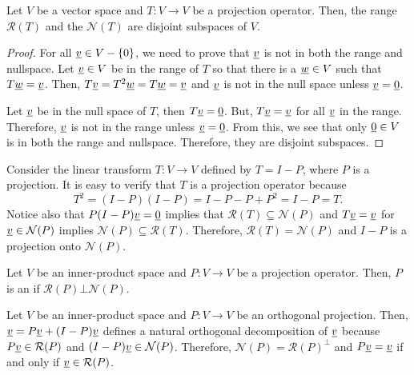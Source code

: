 \begin{theorem}
Let $V$ be a vector space and $T: V \rightarrow V$ be a projection operator.
Then, the range $\mathcal{R}(T)$ and the $\mathcal{N}(T)$ are disjoint subspaces of $V$.
\end{theorem}
\begin{proof}
For all $\underline{v} \in V - \{0\}$, we need to prove that $\underline{v}$ is not in both the range and nullspace.
Let $\underline{v}\in V$ be in the range of $T$ so that there is a $\underline{w}\in V$ such that $T \underline{w} = \underline{v}$.
Then, $T \underline{v} = T^2 \underline{w} = T \underline{w} = \underline{v}$ and $\underline{v}$ is not in the null space unless $\underline{v} = \underline{0}$.

Let $\underline{v}$ be in the null space of $T$, then $T \underline{v} = \underline{0}$.
But, $T \underline{v} = \underline{v}$ for all $\underline{v}$ in the range.
Therefore, $\underline{v}$ is not in the range unless $\underline{v} = \underline{0}$.
From this, we see that only $\underline{0}\in V$ is in both the range and nullspace.
Therefore, they are disjoint subspaces.
\end{proof}

\begin{example}
Consider the linear transform $T: V \rightarrow V$ defined by $T = I - P$, where $P$ is a projection.
It is easy to verify that $T$ is a projection operator because
\[ T^2 = (I-P)(I-P) = I - P- P + P^2 = I-P = T .\]
Notice also that $P(I-P) \underline{v} = \underline{0}$ implies that $\mathcal{R}(T) \subseteq \mathcal{N}(P)$ and $T \underline{v} = \underline{v}$ for $\underline{v} \in \mathcal{N}(P)$ implies $\mathcal{N}(P) \subseteq \mathcal{R}(T)$.
Therefore, $\mathcal{R}(T) = \mathcal{N}(P)$ and $I-P$ is a projection onto $\mathcal{N}(P)$.
\end{example}

\begin{definition}
\label{definition:OrthogonalProjection}
Let $V$ be an inner-product space and $P: V \rightarrow V$ be a projection operator.
Then, $P$ is an  if $\mathcal{R}(P) \bot \mathcal{N}(P)$.
\end{definition}

\begin{example}
Let $V$ be an inner-product space and $P: V \rightarrow V$ be an orthogonal projection.
Then, $\underline{v} = P \underline{v} + (I-P) \underline{v}$ defines a natural orthogonal decomposition of $\underline{v}$ because $P \underline{v} \in \mathcal{R}(P)$ and $(I-P) \underline{v} \in \mathcal{N}(P)$.
Therefore, $\mathcal{N}(P) = \mathcal{R}(P)^{\bot}$ and $P \underline{v} = \underline{v}$ if and only if $\underline{v} \in \mathcal{R}(P)$.
\end{example}

